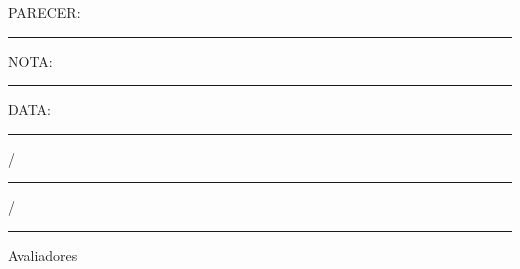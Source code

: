 \begin{titlepage}

\setlength{\ABNTsignthickness}{0.3pt}
\setlength{\ABNTsignwidth}{10cm}
\setlength{\ABNTsignskip}{0.7cm}

\begin{center}
	{\tituloformat\ABNTtitulodata\par}
\end{center}

\vspace{0.3cm}

\begin{center}
	\autorformat\ABNTautordata
\end{center}

\vspace{0.3cm}

\begin{flushleft}
PARECER: \rule{7cm}{.3pt} NOTA:\rule{2cm}{.3pt} 

DATA: \rule{0.75cm}{.3pt}/\rule{0.75cm}{.3pt}/\rule{1.5cm}{.3pt}
\end{flushleft}

\begin{center}
Avaliadores
\end{center}




\end{titlepage}
